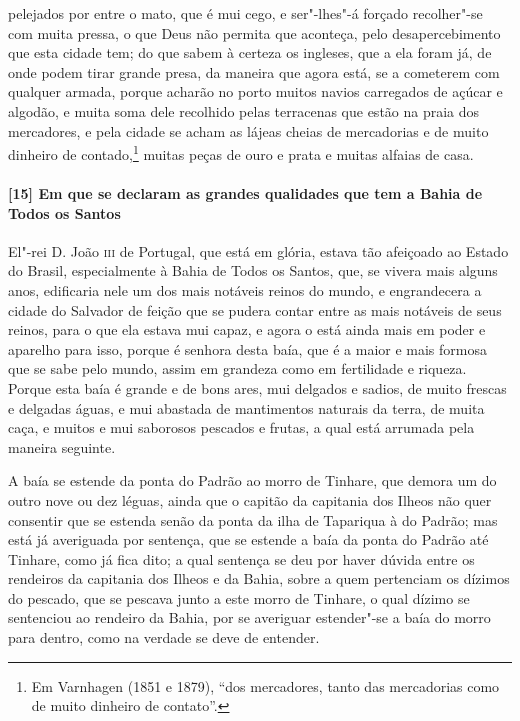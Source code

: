 pelejados por entre o mato, que é mui cego, e ser"-lhes"-á forçado recolher"-se com muita
pressa, o que Deus não permita que aconteça, pelo desapercebimento que esta cidade tem; do
que sabem à certeza os ingleses, que a ela foram já, de onde podem tirar grande presa, da
maneira que agora está, se a cometerem com qualquer armada, porque acharão no porto muitos
navios carregados de açúcar e algodão, e muita soma dele recolhido pelas terracenas que
estão na praia dos mercadores, e pela cidade se acham as lájeas cheias de mercadorias e de
muito dinheiro de contado,\footnote{ Em Varnhagen (1851 e 1879), ``dos mercadores, tanto
das mercadorias como de muito dinheiro de contato''.} muitas peças de ouro e prata e
muitas alfaias de casa.

\paragraph{[15] Em que se declaram as grandes qualidades que tem a Bahia de Todos os Santos} \quad
El"-rei D. João \textsc{iii} de Portugal, que está em glória, estava tão afeiçoado ao
Estado do Brasil, especialmente à Bahia de Todos os Santos, que, se vivera mais alguns
anos, edificaria nele um dos mais notáveis reinos do mundo, e engrandecera a cidade do
Salvador de feição que se pudera contar entre as mais notáveis de seus reinos, para o que
ela estava mui capaz, e agora o está ainda mais em poder e aparelho para isso, porque é
senhora desta baía, que é a maior e mais formosa que se sabe pelo mundo, assim em grandeza
como em fertilidade e riqueza. Porque esta baía é grande e de bons ares, mui delgados e
sadios, de muito frescas e delgadas águas, e mui abastada de mantimentos naturais da
terra, de muita caça, e muitos e mui saborosos pescados e frutas, a qual está arrumada
pela maneira seguinte.

A baía se estende da ponta do Padrão ao morro de Tinhare, que demora um do outro nove ou
dez léguas, ainda que o capitão da capitania dos Ilheos não quer consentir que se estenda
senão da ponta da ilha de Tapariqua à do Padrão; mas está já averiguada por sentença, que
se estende a baía da ponta do Padrão até Tinhare, como já fica dito; a qual sentença se
deu por haver dúvida entre os rendeiros da capitania dos Ilheos e da Bahia, sobre a quem
pertenciam os dízimos do pescado, que se pescava junto a este morro de Tinhare, o qual
dízimo se sentenciou ao rendeiro da Bahia, por se averiguar estender"-se a baía do morro
para dentro, como na verdade se deve de entender.

